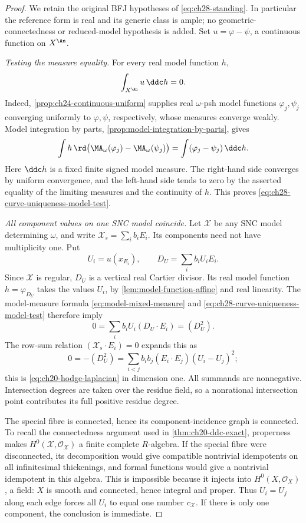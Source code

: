 \begin{proof}
We retain the original BFJ hypotheses of \eqref{eq:ch28-standing}.
In particular the reference form is real and its generic class is ample;
no geometric-connectedness or reduced-model hypothesis is added.
Set \(u=\varphi-\psi\), a continuous function on \(X^{\An}\).

\emph{Testing the measure equality.}
For every real model function \(h\),
\begin{equation}
\label{eq:ch28-curve-uniqueness-model-test}
 \int_{X^{\An}}u\,\ddc h=0.
\end{equation}
Indeed, \cref{prop:ch24-continuous-uniform} supplies real
\(\omega\)-psh model functions \(\varphi_j,\psi_j\) converging
uniformly to \(\varphi,\psi\), respectively, whose measures converge
weakly.  Model integration by parts, \cref{prop:model-integration-by-parts},
gives
\[
 \int h\,\rd\bigl(\MA_\omega(\varphi_j)-\MA_\omega(\psi_j)\bigr)
       =\int(\varphi_j-\psi_j)\,\ddc h.
\]
Here \(\ddc h\) is a fixed finite signed model measure.  The right-hand
side converges by uniform convergence, and the left-hand side tends to
zero by the asserted equality of the limiting measures and the continuity
of \(h\).  This proves \eqref{eq:ch28-curve-uniqueness-model-test}.

\emph{All component values on one SNC model coincide.}
Let \(\mathcal X\) be any SNC model determining \(\omega\), and write
\(\mathcal X_s=\sum_i b_iE_i\).  Its components need not have
multiplicity one.  Put
\[
 U_i=u(x_{E_i}),\qquad D_U=\sum_i b_iU_iE_i.
\]
Since \(\mathcal X\) is regular, \(D_U\) is a vertical real Cartier
divisor.  Its real model function \(h=\varphi_{D_U}\) takes the values
\(U_i\), by \cref{lem:model-function-affine} and real linearity.
The model-measure formula \eqref{eq:model-mixed-measure} and
\eqref{eq:ch28-curve-uniqueness-model-test} therefore imply
\[
 0=\sum_i b_iU_i(D_U\cdot E_i)=(D_U^2).
\]
The row-sum relation \((\mathcal X_s\cdot E_i)=0\) expands this as
\[
 0=-(D_U^2)
   =\sum_{i<j}b_ib_j(E_i\cdot E_j)(U_i-U_j)^2;
\]
this is \eqref{eq:ch20-hodge-laplacian} in dimension one.
All summands are nonnegative.  Intersection degrees are taken over the
residue field, so a nonrational intersection point contributes its full
positive residue degree.

The special fibre is connected, hence its component-incidence graph is
connected.  To recall the connectedness argument used in
\cref{thm:ch20-ddc-exact}, properness makes
\(H^0(\mathcal X,\mathcal O_{\mathcal X})\) a finite complete
\(R\)-algebra.  If the special fibre were disconnected, its decomposition
would give compatible nontrivial idempotents on all infinitesimal
thickenings, and formal functions would give a nontrivial idempotent in
this algebra.  This is impossible because it injects into
\(H^0(X,\mathcal O_X)\), a field: \(X\) is smooth and connected,
hence integral and proper.  Thus \(U_i=U_j\) along each edge forces all
\(U_i\) to equal one number \(c_{\mathcal X}\).  If there is only one
component, the conclusion is immediate.


\end{proof}
